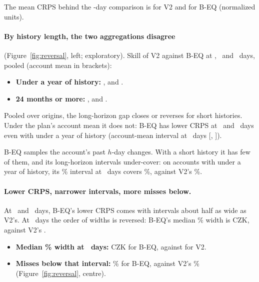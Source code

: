 The mean CRPS behind the \hB-day comparison is 
for V2 and  for B-EQ (normalized
units).

\paragraph{By history length, the two aggregations disagree}
(Figure~\ref{fig:reversal}, left; exploratory). Skill of V2 against B-EQ
at \hA, \hB\ and \hC\ days, pooled (account mean in brackets):
\begin{itemize}
  \item \textbf{Under a year of history:} ,
   and
  .
  \item \textbf{24 months or more:} ,
   and
  .
\end{itemize}
Pooled over origins, the long-horizon gap closes or reverses for short
histories. Under the plan's account mean it does not: B-EQ has lower CRPS
at \hB\ and \hC\ days even with under a year of history (account-mean
interval at \hC\ days
[,
]).

B-EQ samples the account's past $h$-day changes. With a short history it
has few of them, and its long-horizon intervals under-cover: on accounts
with under a year of history, its \lC\% interval at \hC\ days covers
\%, against V2's
\%.

\paragraph{Lower CRPS, narrower intervals, more misses below.} At \hB\ and
\hC\ days, B-EQ's lower CRPS comes with intervals about half as wide as
V2's. At \hA\ days the order of widths is reversed: B-EQ's median \lC\%
width is  CZK, against V2's
.
\begin{itemize}
  \item \textbf{Median \lC\% width at \hC\ days:} 
  CZK for B-EQ, against  for V2.
  \item \textbf{Misses below that interval:} \% for B-EQ,
  against V2's \% (Figure~\ref{fig:reversal},
  centre).
\end{itemize}

